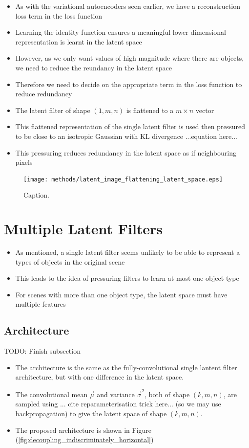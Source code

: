 \begin{itemize}
\item As with the variational autoencoders seen earlier, we have a reconstruction loss term in the loss function
\item Learning the identity function ensures a meaningful lower-dimensional representation is learnt in the latent space
\item However, as we only want values of high magnitude where there are objects, we need to reduce the reundancy in the latent space
\item Therefore we need to decide on the appropriate term in the loss function to reduce redundancy
\item The latent filter of shape $(1, m, n)$ is flattened to a $m \times n$ vector
\item This flattened representation of the single latent filter is used then pressured to be close to an isotropic Gaussian with KL divergence ...equation here...
\item This pressuring reduces redundancy in the latent space as if neighbouring pixels 
\end{itemize}

\begin{figure}[H]
\centering
\captionsetup{justification=centering}
\texttt{[image: methods/latent\_image\_flattening\_latent\_space.eps]}
\caption{Caption.}
\label{fig:latent_image_flattening_latent_space}
\end{figure}


%
%
%
%
%
\section{Multiple Latent Filters}
\begin{itemize}
\item As mentioned, a single latent filter seems unlikely to be able to represent a types of objects in the original scene
\item This leads to the idea of pressuring filters to learn at most one object type
\item For scenes with more than one object type, the latent space must have multiple features
\end{itemize}
%
%
\subsection{Architecture}
TODO: Finish subsection

\begin{itemize}
\item The architecture is the same as the fully-convolutional single lantent filter architecture, but with one difference in the latent space.
\item The convolutional mean $\vec{\mu}$ and variance $\vec{\sigma}^2$, both of shape $(k, m, n)$, are sampled using ... cite reparameterisation trick here... (so we may use backpropagation) to give the latent space of shape $(k, m, n)$. 
\item The proposed architecture is shown in Figure (\ref{fig:decoupling_indiscriminately_horizontal})
\end{itemize}

